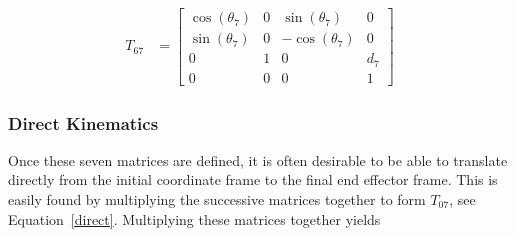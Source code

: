 \documentclass{article}
\begin{document}
\begin{align*}
T_{67} &=
\left[\begin{matrix}\cos{\left (\theta_{7} \right )} & 0 & \sin{\left (\theta_{7} \right )} & 0\\\sin{\left (\theta_{7} \right )} & 0 & - \cos{\left (\theta_{7} \right )} & 0\\0 & 1 & 0 & d_{7}\\0 & 0 & 0 & 1\end{matrix}\right]
\end{align*}

\subsubsection{Direct Kinematics}
Once these seven matrices are defined, it is often desirable to be able to translate directly from the initial coordinate frame to the final end effector frame.
This is easily found by multiplying the successive matrices together to form $T_{07}$, see Equation~\ref{direct}.
Multiplying these matrices together yields
\end{document}
